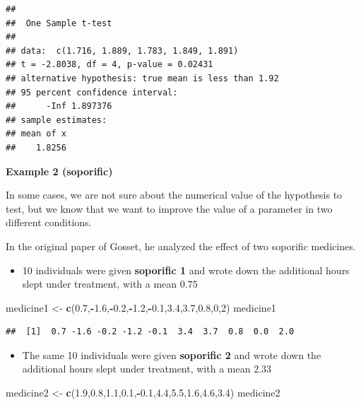 \documentclass[
]{book}
\newenvironment{Shaded}{\begin{snugshade}}{\end{snugshade}}
\newcommand{\DecValTok}[1]{\textcolor[rgb]{0.00,0.00,0.81}{#1}}
\newcommand{\FloatTok}[1]{\textcolor[rgb]{0.00,0.00,0.81}{#1}}
\newcommand{\FunctionTok}[1]{\textcolor[rgb]{0.13,0.29,0.53}{\textbf{#1}}}
\newcommand{\NormalTok}[1]{#1}
\newcommand{\OtherTok}[1]{\textcolor[rgb]{0.56,0.35,0.01}{#1}}
\newcommand{\SpecialCharTok}[1]{\textcolor[rgb]{0.81,0.36,0.00}{\textbf{#1}}}
\providecommand{\tightlist}{%
  \setlength{\itemsep}{0pt}\setlength{\parskip}{0pt}}
\begin{document}
\begin{verbatim}
## 
##  One Sample t-test
## 
## data:  c(1.716, 1.889, 1.783, 1.849, 1.891)
## t = -2.8038, df = 4, p-value = 0.02431
## alternative hypothesis: true mean is less than 1.92
## 95 percent confidence interval:
##      -Inf 1.897376
## sample estimates:
## mean of x 
##    1.8256
\end{verbatim}

\textbf{Example 2 (soporific)}

In some cases, we are not sure about the numerical value of the hypothesis to test, but we know that we want to improve the value of a parameter in two different conditions.

In the original paper of Gosset, he analyzed the effect of two soporific medicines.

\begin{itemize}
\tightlist
\item
  10 individuals were given \textbf{soporific 1} and wrote down the additional hours slept under treatment, with a mean \(0.75\)
\end{itemize}

\begin{Shaded}
\begin{Highlighting}[]
\NormalTok{medicine1 }\OtherTok{\textless{}{-}} \FunctionTok{c}\NormalTok{(}\FloatTok{0.7}\NormalTok{,}\SpecialCharTok{{-}}\FloatTok{1.6}\NormalTok{,}\SpecialCharTok{{-}}\FloatTok{0.2}\NormalTok{,}\SpecialCharTok{{-}}\FloatTok{1.2}\NormalTok{,}\SpecialCharTok{{-}}\FloatTok{0.1}\NormalTok{,}\FloatTok{3.4}\NormalTok{,}\FloatTok{3.7}\NormalTok{,}\FloatTok{0.8}\NormalTok{,}\DecValTok{0}\NormalTok{,}\DecValTok{2}\NormalTok{)}
\NormalTok{medicine1}
\end{Highlighting}
\end{Shaded}

\begin{verbatim}
##  [1]  0.7 -1.6 -0.2 -1.2 -0.1  3.4  3.7  0.8  0.0  2.0
\end{verbatim}

\begin{itemize}
\tightlist
\item
  The same 10 individuals were given \textbf{soporific 2} and wrote down the additional hours slept under treatment, with a mean \(2.33\)
\end{itemize}

\begin{Shaded}
\begin{Highlighting}[]
\NormalTok{medicine2 }\OtherTok{\textless{}{-}} \FunctionTok{c}\NormalTok{(}\FloatTok{1.9}\NormalTok{,}\FloatTok{0.8}\NormalTok{,}\FloatTok{1.1}\NormalTok{,}\FloatTok{0.1}\NormalTok{,}\SpecialCharTok{{-}}\FloatTok{0.1}\NormalTok{,}\FloatTok{4.4}\NormalTok{,}\FloatTok{5.5}\NormalTok{,}\FloatTok{1.6}\NormalTok{,}\FloatTok{4.6}\NormalTok{,}\FloatTok{3.4}\NormalTok{)}
\NormalTok{medicine2}
\end{Highlighting}
\end{Shaded}
\end{document}
